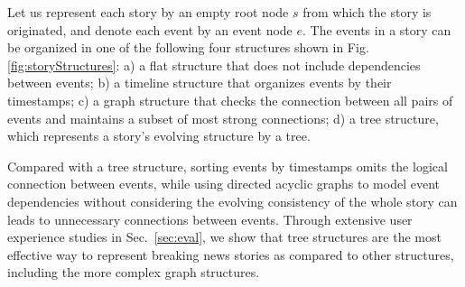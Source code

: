 Let us represent each story by an empty root node $s$ from which the story is originated, and denote each event by an event node $e$. The events in a story can be organized in one of the following four structures shown in Fig. \ref{fig:storyStructures}: a) a flat structure that does not include dependencies between events; b) a timeline structure that organizes events by their timestamps; c) a graph structure that checks the connection between all pairs of events and maintains a subset of most strong connections; d) a tree structure, which represents a story's evolving structure by a tree.  

Compared with a tree structure, sorting events by timestamps omits the logical connection between events, while using directed acyclic graphs to model event dependencies without considering the evolving consistency of the whole story can leads to unnecessary connections between events.
Through extensive user experience studies in Sec.~\ref{sec:eval}, we show that tree structures are the most effective way to represent breaking news stories as compared to other structures, including the more complex graph structures. 
